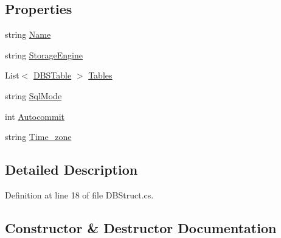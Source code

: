\subsection*{Properties}
\begin{DoxyCompactItemize}
\item 
string \mbox{\hyperlink{class_n_t_k_1_1_database_1_1_d_b_struct_a702e12d227f43958392dd8e3300070e1}{Name}}
\item 
string \mbox{\hyperlink{class_n_t_k_1_1_database_1_1_d_b_struct_a27fb929cebb52373aca0d9a4073f5a2d}{Storage\+Engine}}
\item 
List$<$ \mbox{\hyperlink{class_n_t_k_1_1_database_1_1_d_b_s_table}{D\+B\+S\+Table}} $>$ \mbox{\hyperlink{class_n_t_k_1_1_database_1_1_d_b_struct_acbc22968af9b9bca55043582f43fbfb4}{Tables}}
\item 
string \mbox{\hyperlink{class_n_t_k_1_1_database_1_1_d_b_struct_a70000817a704bab0e2ed63c1968aebe0}{Sql\+Mode}}
\item 
int \mbox{\hyperlink{class_n_t_k_1_1_database_1_1_d_b_struct_a404b3dda83adb456fae34a9e0334997f}{Autocommit}}
\item 
string \mbox{\hyperlink{class_n_t_k_1_1_database_1_1_d_b_struct_ac2234ff243e2da67b745ea794f8cb3be}{Time\+\_\+zone}}
\end{DoxyCompactItemize}


\subsection{Detailed Description}


Definition at line 18 of file D\+B\+Struct.\+cs.



\subsection{Constructor \& Destructor Documentation}
\mbox{\label{class_n_t_k_1_1_database_1_1_d_b_struct_a4407e47c99c373a0aa24d8c1a75a96e5}} 
